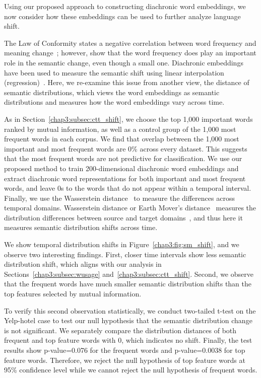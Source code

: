Using our proposed approach to constructing diachronic word embeddings,
we now consider how these embeddings can be used to further analyze language shift.

The Law of Conformity states a negative correlation between word frequency and meaning change~\cite{hamilton2016diachronic}; however, \cite{dubossarsky2017outta} show that the word frequency does play an important role in the semantic change, even though a small one. 
Diachronic embeddings have been used to measure the semantic shift using linear interpolation (regression)~\cite{hamilton2016diachronic}. 
Here, we re-examine this issue from another view, the distance of semantic distributions, which views the word embeddings as semantic distributions and measures how the word embeddings vary across time.

As in Section~\ref{chap3:subsec:ctt_shift},
we choose the top 1,000 important words ranked by mutual information, as well as a control group of the 1,000 most frequent words in each corpus.  We find that overlap between the 1,000 most important and most frequent words are 0\% across every dataset. This suggests that the most frequent words are not predictive for classification. 
We use our proposed method to train 200-dimensional diachronic word embeddings and extract diachronic word representations for both important and most frequent words, and leave 0s to the words that do not appear within a temporal interval. 
Finally, we use the Wasserstein distance~\cite{shen2018wasserstein} to measure the differences across temporal domains.
Wasserstein distance or Earth Mover's distance~\cite{vallender1974calculation} measures the distribution differences between source and target domains~\cite{shen2018wasserstein},
and thus here it measures semantic distribution shifts across time. 

We show temporal distribution shifts in Figure~\ref{chap3:fig:sm_shift}, 
and we observe two interesting findings. 
First, closer time intervals show less semantic distribution shift, which aligns with our analysis in Sections~\ref{chap3:subsec:wusage} and~\ref{chap3:subsec:ctt_shift}. Second, we observe that the frequent words have much smaller semantic distribution shifts than the top features selected by mutual information. 

To verify this second observation statistically, we conduct two-tailed t-test on the Yelp-hotel case to test our null hypothesis that the semantic distribution change is not significant. We separately compare the distribution distances of both frequent and top feature words with 0, which indicates no shift. Finally, the test results show p-value=0.076 for the frequent words and p-value=0.0038 for top feature words. Therefore, we reject the null hypothesis of top feature words at 95\% confidence level while we cannot reject the null hypothesis of frequent words.


